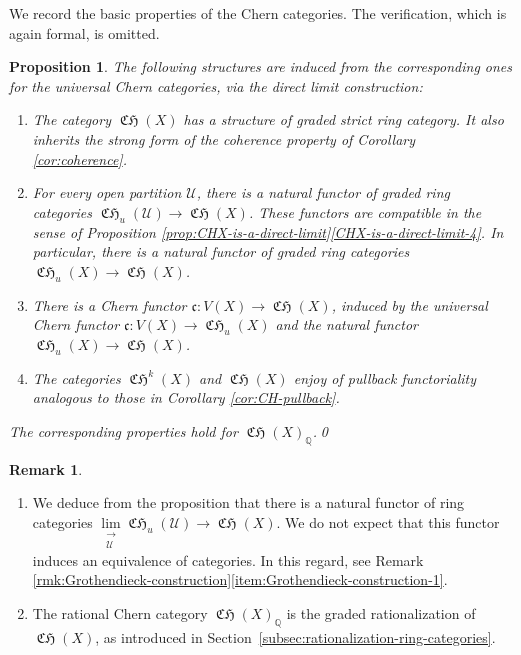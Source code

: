 \documentclass[JEP,XML,SOM,Unicode,published]{cedram}
\theoremstyle{plain}
\newtheorem{proposition}[theorem]{Proposition}
\theoremstyle{definition}
\newtheorem{remark}[theorem]{Remark}
\newcommand{\QBbb}{\mathbb Q}
\newcommand{\Ucal}{\mathcal U}
\newcommand{\cfrak}{\mathfrak c}
\DeclareMathOperator{\CHfrak}{\mathfrak{CH}}
\begin{document}
We record the basic properties of the Chern categories. The verification, which is again formal, is omitted.
\begin{proposition}\label{prop:formal-properties-CH-quasi-compact}
The following structures are induced from the corresponding ones for the universal Chern categories, via the direct limit construction:
\begin{enumerate}
\item\label{item:formal-properties-CH-quasi-compact-1} The category $\CHfrak(X)$ has a structure of graded strict ring category. It also inherits the strong form of the coherence property of Corollary \ref{cor:coherence}.
\item\label{item:formal-properties-CH-quasi-compact-2} For every open partition $\Ucal$, there is a natural functor of graded ring categories $\CHfrak_{u}(\Ucal)\to\CHfrak(X)$. These functors are compatible in the sense of Proposition \ref{prop:CHX-is-a-direct-limit}\eqref{CHX-is-a-direct-limit-4}. In particular, there is a natural functor of graded ring categories $\CHfrak_{u}(X)\to\CHfrak(X)$.
\item\label{item:formal-properties-CH-quasi-compact-5} There is a Chern functor $\cfrak\colon V(X)\to\CHfrak(X)$, induced by the universal Chern functor $\cfrak\colon V(X)\to\CHfrak_{u}(X)$ and the natural functor $\CHfrak_{u}(X)\to\CHfrak(X)$.
\item\label{item:formal-properties-CH-quasi-compact-6} The categories $\CHfrak^{k}(X)$ and $\CHfrak(X)$ enjoy of pullback functoriality analogous to those in Corollary \ref{cor:CH-pullback}.
\end{enumerate}
The corresponding properties hold for $\CHfrak(X)_{\QBbb}$.\qed
\end{proposition}

\skpt
\begin{remark}
\begin{enumerate}
\item We deduce from the proposition that there is a natural functor of ring categories $\underset{\substack{\longrightarrow\\ \Ucal}}{\lim}\CHfrak_{u}(\Ucal)\to\CHfrak(X)$. We do not expect that this functor induces an equivalence of categories. In this regard, see Remark \eqref{rmk:Grothendieck-construction}\eqref{item:Grothendieck-construction-1}.
\item The rational Chern category $\CHfrak(X)_{\QBbb}$ is the graded rationalization of $\CHfrak(X)$, as introduced in Section~\ref{subsec:rationalization-ring-categories}.
\end{enumerate}
\end{remark}
\end{document}
